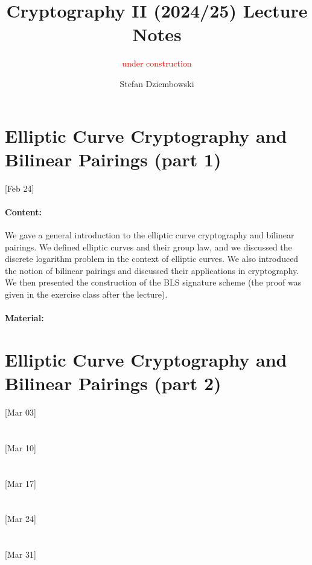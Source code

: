 \documentclass{llncs}
\title{Cryptography II (2024/25) Lecture Notes}
\subtitle{\textcolor{red}{under construction}}
\author{Stefan Dziembowski}
\institute{University of Warsaw}
\begin{document}
\maketitle

\section{Elliptic Curve Cryptography and Bilinear Pairings (part 1)}

[Feb 24]

\paragraph{Content:} We gave a general introduction to the elliptic curve cryptography and bilinear pairings. We defined elliptic curves and their group law, and we discussed the discrete logarithm problem in the context of elliptic curves. We also introduced the notion of bilinear pairings and discussed their applications in cryptography. We then presented the construction of the BLS signature scheme \cite{Boneh2001} (the proof was given in the exercise class after the lecture). 

\paragraph{Material:} \cite{Boneh2023}



\section{Elliptic Curve Cryptography and Bilinear Pairings (part 2)}

[Mar 03]

\section{}
[Mar 10]

\section{}
[Mar 17]

\section{}
[Mar 24]

\section{}
[Mar 31]
\end{document}
